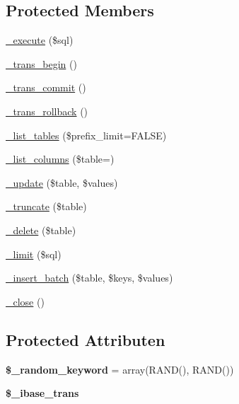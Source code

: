 \subsection*{Protected Members}
\begin{DoxyCompactItemize}
\item 
\mbox{\hyperlink{class_c_i___d_b__ibase__driver_a114ab675d89bf8324a41785fb475e86d}{\+\_\+execute}} (\$sql)
\item 
\mbox{\hyperlink{class_c_i___d_b__ibase__driver_ac81ac882c1d54347d810199a15856aac}{\+\_\+trans\+\_\+begin}} ()
\item 
\mbox{\hyperlink{class_c_i___d_b__ibase__driver_a6fe7f373e0b11cfae23a5f41c0b35dda}{\+\_\+trans\+\_\+commit}} ()
\item 
\mbox{\hyperlink{class_c_i___d_b__ibase__driver_ad49a116b0776c26b53114c9093fd102a}{\+\_\+trans\+\_\+rollback}} ()
\item 
\mbox{\hyperlink{class_c_i___d_b__ibase__driver_a435c0f3ce54fe7daa178baa8532ebd54}{\+\_\+list\+\_\+tables}} (\$prefix\+\_\+limit=F\+A\+L\+SE)
\item 
\mbox{\hyperlink{class_c_i___d_b__ibase__driver_a7ccb7f9c301fe7f0a9db701254142b63}{\+\_\+list\+\_\+columns}} (\$table=\textquotesingle{}\textquotesingle{})
\item 
\mbox{\hyperlink{class_c_i___d_b__ibase__driver_a2540b03a93fa73ae74c10d0e16fc073e}{\+\_\+update}} (\$table, \$values)
\item 
\mbox{\hyperlink{class_c_i___d_b__ibase__driver_aa029600528fc1ce660a23ff4b4667f95}{\+\_\+truncate}} (\$table)
\item 
\mbox{\hyperlink{class_c_i___d_b__ibase__driver_a133ea8446ded52589bd22cc9163d0896}{\+\_\+delete}} (\$table)
\item 
\mbox{\hyperlink{class_c_i___d_b__ibase__driver_a3a02ea06541b8ecc25a33a61651562c8}{\+\_\+limit}} (\$sql)
\item 
\mbox{\hyperlink{class_c_i___d_b__ibase__driver_a1978e1358c812587a46e242630365099}{\+\_\+insert\+\_\+batch}} (\$table, \$keys, \$values)
\item 
\mbox{\hyperlink{class_c_i___d_b__ibase__driver_a4d9082658000e5ede8312067c6dda9db}{\+\_\+close}} ()
\end{DoxyCompactItemize}
\subsection*{Protected Attributen}
\begin{DoxyCompactItemize}
\item 
\mbox{\label{class_c_i___d_b__ibase__driver_a10213aa6e05f6d924d3277bb1d2fea00}} 
{\bfseries \$\+\_\+random\+\_\+keyword} = array(\textquotesingle{}R\+A\+ND()\textquotesingle{}, \textquotesingle{}R\+A\+ND()\textquotesingle{})
\item 
\mbox{\label{class_c_i___d_b__ibase__driver_a515e622846336e361f281a522c025059}} 
{\bfseries \$\+\_\+ibase\+\_\+trans}
\end{DoxyCompactItemize}


